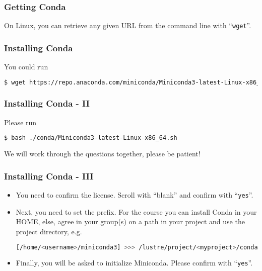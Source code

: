 \begin{frame}[fragile]
  \frametitle{Getting Conda}
  On Linux, you can retrieve any given URL from the command line with ``\texttt{wget}''. 
  \pause
\end{frame}

\begin{frame}[fragile]
  \frametitle{Installing Conda}
  You could run
  \begin{lstlisting}[language=Bash, style=Shell, basicstyle=\small,breaklines=true ]
$ wget https://repo.anaconda.com/miniconda/Miniconda3-latest-Linux-x86_64.sh
  \end{lstlisting}
  \pause
 \end{frame} 
 
\begin{frame}[fragile]
  \frametitle{Installing Conda - II}
  Please run
  \begin{lstlisting}[language=Bash, style=Shell]
$ bash ./conda/Miniconda3-latest-Linux-x86_64.sh
  \end{lstlisting}
  We will work through the questions together, please be patient!
\end{frame}

\begin{frame}[fragile]
  \frametitle{Installing Conda - III}
  \begin{itemize}[<+->]
   \item You need to confirm the license. Scroll with ``blank'' and confirm with ``\verb+yes+''.
   \item Next, you need to set the prefix. For the course you can install Conda in your HOME, else, agree in your group(s) on a path in your project and use the project directory, e.g. 
   \begin{lstlisting}[language=Bash, style=Shell, breaklines=true ]
[/home/<username>/miniconda3] >>> /lustre/project/<myproject>/conda
   \end{lstlisting}
   \item Finally, you will be asked to initialize Miniconda. Please confirm with ``\verb+yes+''.
  \end{itemize}
\end{frame}

